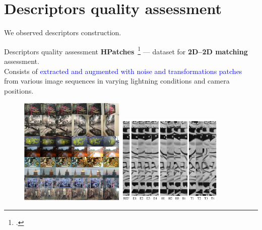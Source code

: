 \documentclass[aspectratio=169]{beamer}
\newcommand{\sh}{0.2cm}
\begin{document}
\section{Descriptors quality assessment}
\begin{frame}

\centering \Large We observed descriptors construction.\\

\vspace{\sh}
\end{frame}


\begin{frame}{Descriptors quality assessment}
\textbf{HPatches}~\footcite{HPatches} --- dataset for \textbf{2D--2D matching} assessment.\\
Consists of \textcolor{blue}{extracted and augmented with noise and transformations patches} from various image sequences in varying lightning conditions and camera positions.

\begin{figure}
	\begin{minipage}[b]{5cm}
		\includegraphics[width=5cm]{SemCSE_hpatches}
	\end{minipage}%
	\hfill
	\begin{minipage}[b]{5cm}
		\includegraphics[width=5cm]{SemCSE_hpatches2}
	\end{minipage}%
\end{figure}

\end{frame}
\end{document}

